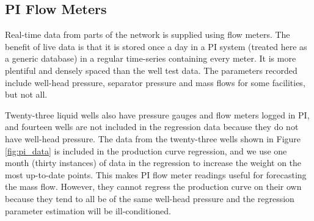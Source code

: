 \documentclass[a4paper, 12pt]{article}
\begin{document}

\subsection{PI Flow Meters}
Real-time data from parts of the network is supplied using flow meters. The benefit of live data is that it is stored once a day in a PI system (treated here as a generic database) in a regular time-series containing every meter. It is more plentiful and densely spaced than the well test data. The parameters recorded include well-head pressure, separator pressure and mass flows for some facilities, but not all.


Twenty-three liquid wells also have pressure gauges and flow meters logged in PI, and fourteen wells are not included in the regression data because they do not have well-head pressure. The data from the twenty-three wells shown in Figure \ref{fig:pi_data} is included in the production curve regression, and we use one month (thirty instances) of data in the regression to increase the weight on the most up-to-date points. This makes PI flow meter readings useful for forecasting the mass flow. However, they cannot regress the production curve on their own because they tend to all be of the same well-head pressure and the regression parameter estimation will be ill-conditioned.
\end{document}
